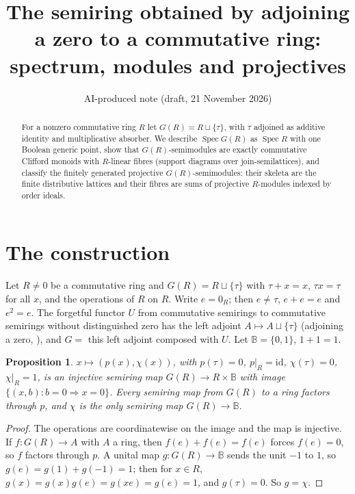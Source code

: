 \documentclass[11pt]{amsart}
\title[Adjoining a zero to a commutative ring]{The semiring obtained by adjoining a zero to a commutative ring:\\
spectrum, modules and projectives}
\author[AI-produced note]{AI-produced note (draft, 21 November 2026)}
\newtheorem{proposition}[theorem]{Proposition}
\theoremstyle{remark}\newtheorem{remark}[theorem]{Remark}
\newcommand{\B}{\mathbb B}
\begin{document}
\begin{abstract}
For a nonzero commutative ring $R$ let $G(R)=R\sqcup\{\tau\}$, with $\tau$ adjoined as additive identity and
multiplicative absorber. We describe $\operatorname{Spec}G(R)$ as $\operatorname{Spec}R$ with one Boolean generic
point, show that $G(R)$-semimodules are exactly commutative Clifford monoids with $R$-linear fibres (support diagrams
over join-semilattices), and classify the finitely generated projective $G(R)$-semimodules: their skeleta are the
finite distributive lattices and their fibres are sums of projective $R$-modules indexed by order ideals.
\end{abstract}
\maketitle

\section{The construction}
Let $R\neq0$ be a commutative ring and $G(R)=R\sqcup\{\tau\}$ with $\tau+x=x$, $\tau x=\tau$ for all $x$, and the
operations of $R$ on $R$. Write $e=0_R$; then $e\neq\tau$, $e+e=e$ and $e^2=e$. The forgetful functor $U$ from
commutative semirings to commutative semirings without distinguished zero has the left adjoint $A\mapsto A\sqcup\{\tau\}$
(adjoining a zero, \cite{golan}), and $G=$ this left adjoint composed with $U$. Let $\B=\{0,1\}$, $1+1=1$.

\begin{proposition}\label{normal}
$x\mapsto(p(x),\chi(x))$, with $p(\tau)=0$, $p|_R=\mathrm{id}$, $\chi(\tau)=0$, $\chi|_R=1$, is an injective semiring map
$G(R)\to R\times\B$ with image $\{(x,b):b=0\Rightarrow x=0\}$. Every semiring map from $G(R)$ to a ring factors
through $p$, and $\chi$ is the only semiring map $G(R)\to\B$.
\end{proposition}
\begin{proof}
The operations are coordinatewise on the image and the map is injective. If $f\colon G(R)\to A$ with $A$ a ring, then
$f(e)+f(e)=f(e)$ forces $f(e)=0$, so $f$ factors through $p$. A unital map $g\colon G(R)\to\B$ sends the unit $-1$ to $1$, so
$g(e)=g(1)+g(-1)=1$; then for $x\in R$, $g(x)=g(x)g(e)=g(xe)=g(e)=1$, and $g(\tau)=0$. So $g=\chi$.
\end{proof}
\end{document}
